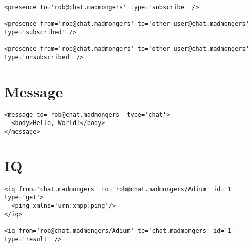 \pause
\begin{shaded}
\begin{verbatim}
<presence to='rob@chat.madmongers' type='subscribe' />

<presence from='rob@chat.madmongers' to='other-user@chat.madmongers' type='subscribed' />

<presence from='rob@chat.madmongers' to='other-user@chat.madmongers' type='unsubscribed' />
\end{verbatim}
\end{shaded}

\newpage
\section{Message}

\begin{shaded}
\begin{verbatim}
<message to='rob@chat.madmongers' type='chat'>
  <body>Hello, World!</body>
</message>
\end{verbatim}
\end{shaded}

\newpage
\section{IQ}

\begin{shaded}
\begin{verbatim}
<iq from='chat.madmongers' to='rob@chat.madmongers/Adium' id='1' type='get'>
  <ping xmlns='urn:xmpp:ping'/>
</iq>

<iq from='rob@chat.madmongers/Adium' to='chat.madmongers' id='1' type='result' />
\end{verbatim}
\end{shaded}
